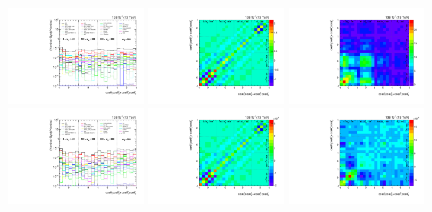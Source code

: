 \begin{figure}[htb]
\begin{center}
 \includegraphics[width=0.32\textwidth]{fig_fullRun2UL/unfolding/combined/deltaSystCombinedlog_rebinnedB_c_Prk_mttbar.pdf}
 \includegraphics[width=0.32\textwidth]{fig_fullRun2UL/unfolding/combined/StatCovMatrix_rebinnedB_c_Prk_mttbar.pdf}
 \includegraphics[width=0.32\textwidth]{fig_fullRun2UL/unfolding/combined/TotalSystCovMatrix_rebinnedB_c_Prk_mttbar.pdf} \\
 \includegraphics[width=0.32\textwidth]{fig_fullRun2UL/unfolding/combined/deltaSystCombinedlogNorm_rebinnedB_c_Prk_mttbar.pdf}
 \includegraphics[width=0.32\textwidth]{fig_fullRun2UL/unfolding/combined/StatCovMatrixNorm_rebinnedB_c_Prk_mttbar.pdf}
 \includegraphics[width=0.32\textwidth]{fig_fullRun2UL/unfolding/combined/TotalSystCovMatrixNorm_rebinnedB_c_Prk_mttbar.pdf} \\

\end{center}
\end{figure}
